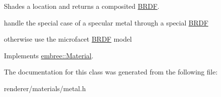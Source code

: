 Shades a location and returns a composited \hyperlink{classembree_1_1_b_r_d_f}{BRDF}. 



handle the special case of a specular metal through a special \hyperlink{classembree_1_1_b_r_d_f}{BRDF}

otherwise use the microfacet \hyperlink{classembree_1_1_b_r_d_f}{BRDF} model 



Implements \hyperlink{classembree_1_1_material_a371ca178d6cc226c3d6c758cb41f8cef}{embree::Material}.



The documentation for this class was generated from the following file:\begin{DoxyCompactItemize}
\item 
renderer/materials/metal.h\end{DoxyCompactItemize}
